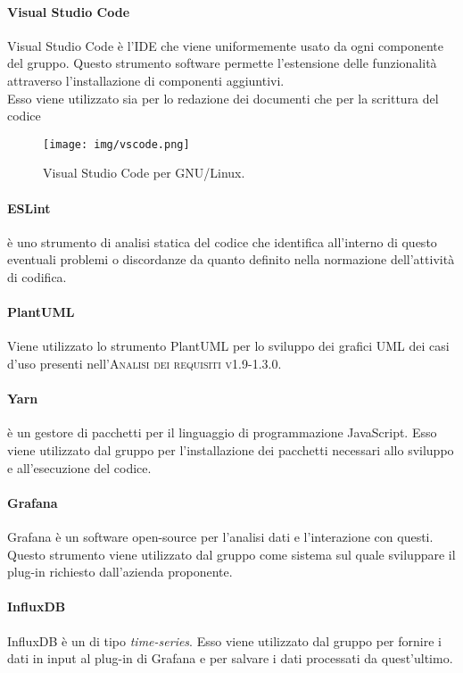 \documentclass[../norme-di-progetto.tex]{subfiles}
\begin{document}
\paragraph{Visual Studio Code}
Visual Studio Code è l'IDE che viene uniformemente usato da ogni componente del gruppo. Questo strumento software permette l'estensione delle funzionalità attraverso l'installazione di componenti aggiuntivi. \\
Esso viene utilizzato sia per lo redazione dei documenti che per la scrittura del codice

\begin{figure}[H]
  \centering
  \texttt{[image: img/vscode.png]}
  \label{fig:github}
  \caption{Visual Studio Code per GNU/Linux.}
\end{figure}

\paragraph{ESLint}
 è uno strumento di analisi statica del codice che identifica all'interno di questo eventuali problemi o discordanze da quanto definito nella normazione dell'attività di codifica.

\paragraph{PlantUML}
Viene utilizzato lo strumento PlantUML per lo sviluppo dei grafici UML dei casi d'uso presenti nell'\textsc{Analisi dei requisiti v1.9-1.3.0}.

\paragraph{Yarn}
 è un gestore di pacchetti per il linguaggio di programmazione JavaScript. Esso viene utilizzato dal gruppo per l'installazione dei pacchetti necessari allo sviluppo e all'esecuzione del codice.

\paragraph{Grafana}
Grafana è un software open-source per l'analisi dati e l'interazione con questi. Questo strumento viene utilizzato dal gruppo come sistema sul quale sviluppare il plug-in richiesto dall'azienda proponente.

\paragraph{InfluxDB}
InfluxDB è un  di tipo \textit{time-series}. Esso viene utilizzato dal gruppo per fornire i dati in input al plug-in di Grafana e per salvare i dati processati da quest'ultimo.
\end{document}
